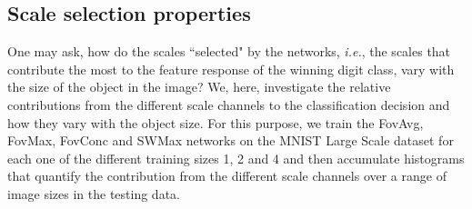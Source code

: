 \documentclass[twocolumn,runningheads]{svjour3}
\begin{document}
\subsection{Scale selection properties}

One may ask, how do the scales ``selected" by the networks, {\em i.e.\/}, the scales that contribute the most to the feature response of the winning digit class, vary with the size of the object in the image? We, here, investigate the relative contributions from the different scale channels to the classification decision
and how they vary with the object size. For this purpose, we train the FovAvg,
FovMax, FovConc and SWMax networks on the MNIST Large Scale dataset for each one of the different training sizes 1, 2 and 4 and then accumulate histograms that quantify the contribution from the different scale channels over a range of image sizes in the testing data.
\end{document}
